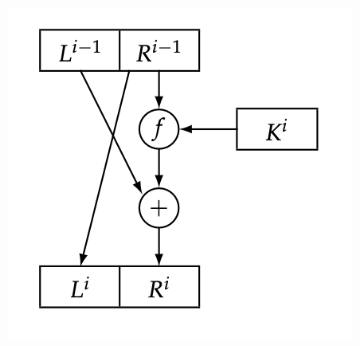 \documentclass[11pt, oneside]{article}   	%
\begin{document}
\begin{figure}[H]
\begin{subfigure}[h]{0.4\linewidth}
\includegraphics[width=\linewidth]{DES2}
\end{subfigure}%
\end{figure}
\end{document}
